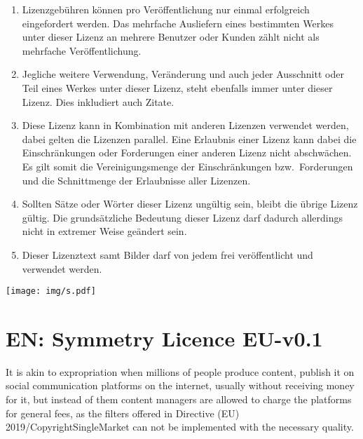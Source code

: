 \documentclass[a4paper,8pt]{extarticle}
\begin{document}
\begin{enumerate}
 \item Lizenzgebühren können pro Veröffentlichung nur einmal erfolgreich eingefordert werden. Das mehrfache Ausliefern eines bestimmten Werkes unter dieser Lizenz an mehrere Benutzer oder Kunden zählt nicht als mehrfache Veröffentlichung.

 \item Jegliche weitere Verwendung, Veränderung und auch jeder Ausschnitt oder Teil eines Werkes unter dieser Lizenz, steht ebenfalls immer unter dieser Lizenz. Dies inkludiert auch Zitate.
 
 \item Diese Lizenz kann in Kombination mit anderen Lizenzen verwendet werden, dabei gelten die Lizenzen parallel. Eine Erlaubnis einer Lizenz kann dabei die Einschränkungen oder Forderungen einer anderen Lizenz nicht abschwächen. Es gilt somit die Vereinigungsmenge der Einschränkungen bzw.\ Forderungen und die Schnittmenge der Erlaubnisse aller Lizenzen.

 \item Sollten Sätze oder Wörter dieser Lizenz ungültig sein, bleibt die übrige Lizenz gültig. Die grundsätzliche Bedeutung dieser Lizenz darf dadurch allerdings nicht in extremer Weise geändert sein.

 \item Dieser Lizenztext samt Bilder darf von jedem frei veröffentlicht und verwendet werden.
\end{enumerate}

\begin{center}\texttt{[image: img/s.pdf]}\end{center}


\pagebreak
{} 
\frenchspacing
\section{EN: Symmetry Licence EU-v0.1}
\label{EN}

It is akin to expropriation when millions of people produce content, publish it on social communication platforms on the internet, usually without receiving money for it, but instead of them content managers are allowed to charge the platforms for general fees, as the filters offered in Directive (EU) 2019/CopyrightSingleMarket can not be implemented with the necessary quality.
\end{document}
